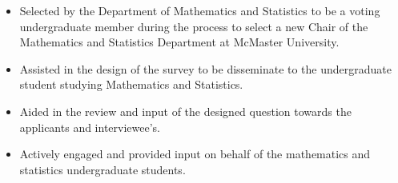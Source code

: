\begin{cventries}
{\begin{cvitems}
        \begin{itemize} 
        \item {Selected by the Department of Mathematics and Statistics to be a voting undergraduate member during the process to select a new Chair of the Mathematics and Statistics Department at McMaster University.}
        \item {Assisted in the design of the survey to be disseminate to the undergraduate student studying Mathematics and Statistics.}
        \item {Aided in the review and input of the designed question towards the applicants and interviewee's.}
        \item {Actively engaged and provided input on behalf of the mathematics and statistics undergraduate students.}
        \end{itemize}
      \end{cvitems}
    }

\end{cventries}

\vspace{0.25cm}

